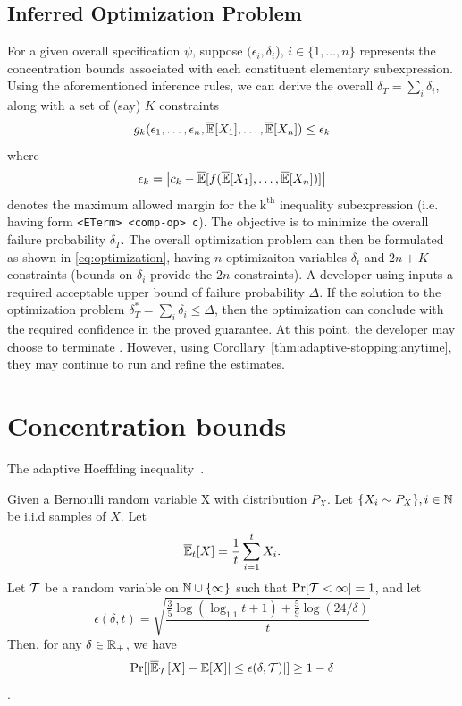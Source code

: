 \subsection{Inferred Optimization Problem}
\label{sec:appendix:inferrence-rules:opt}
For a given overall specification $\psi$, suppose $(\epsilon_i, \delta_i$), $i \in \{1, \dots, n\}$ represents the concentration bounds associated with each constituent elementary subexpression. 
Using the aforementioned inference rules, we can derive the overall $\delta_T = \sum\limits_{i}\delta_i$, along with a set of (say) $K$ constraints 
\[
g_k(\epsilon_{1}, \dots, \epsilon_{n}, \overline{\mathbb{E}}[X_1], \dots, \overline{\mathbb{E}}[X_n]) \leq \epsilon_k
\]
where 
\[
\epsilon_k = \left|c_k - \overline{\mathbb{E}}[f(\overline{\mathbb{E}}[X_1], \dots, \overline{\mathbb{E}}[X_n])]\right|
\]
denotes the maximum allowed margin for the $\text{k}^{\text{th}}$ inequality subexpression (i.e. having form \texttt{<ETerm> <comp-op> c}).
The objective is to minimize the overall failure probability $\delta_T$.
The overall optimization problem can then be formulated as shown in \ref{eq:optimization},
having $n$ optimizaiton variables $\delta_i$ and $2n + K$ constraints (bounds on $\delta_i$ provide the $2n$ constraints).  
A developer using \AVOIRmethodname{} inputs a required acceptable upper bound of failure probability $\Delta$.
If the solution to the optimization problem $\delta_T^* = \sum_i \delta_i \leq \Delta$, then the optimization can conclude with the required confidence in the proved guarantee.
At this point, the developer may choose to terminate \AVOIRmethodname{}.
However, using Corollary~\ref{thm:adaptive-stopping:anytime}, they may continue to run and refine the estimates.

\section{Concentration bounds}
The adaptive Hoeffding inequality~\citep{zhao2016adaptive, bastani2019probabilistic}. 


\begin{theorem}
\label{thm:adaptive-stopping}
Given a Bernoulli random variable X with distribution $P_X$. Let $\{X_i \sim P_X\}, i \in \mathbb{N}$ be i.i.d samples of $X$. Let 
\[
\overline{\mathbb{E}}_t[X] = \frac{1}{t}\sum\limits_{i=1}^{t}X_i.
\]
Let ${\mathcal{T}}$ be a random variable on $\mathbb{N} \cup \{\infty\}$ such that $\Pr[{\mathcal{T}} < \infty] = 1$, and let
\[
    \epsilon(\delta, t) = \sqrt{ \frac{ \frac{3}{5}\log{(\log_{1.1}{t} + 1)} + \frac{5}{9}\log{(24/\delta)} } {t}}
\]
Then, for any $\delta \in \mathbb{R}_+$, we have
\[
  \Pr[|\overline{\mathbb{E}}_{\mathcal{T}}[X] - \mathbb{E}[X]| \leq \epsilon(\delta, {\mathcal{T}})|] \geq 1 - \delta 
\]
.
\end{theorem}



